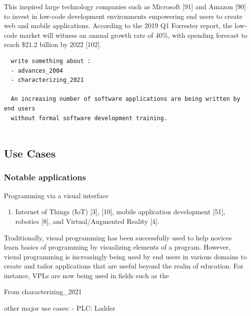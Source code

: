 This inspired large technology companies such as Microsoft [91] and Amazon [90] 
to invest in low-code development environments empowering end users to 
create web and mobile applications. 
According to the 2019 Q1 Forrester report, the low-code market will witness an 
annual growth rate of 40\%, 
with spending forecast to reach \$21.2 billion by 2022 [102]. 

\begin{lstlisting} 
  write something about : 
  - advances_2004
  - characterizing_2021
  
  An increasing number of software applications are being written by end users 
  without formal software development training. 
 
\end{lstlisting}


\subsection{Use Cases}


\subsubsection{Notable applications}

Programming via a visual interface 

\begin{enumerate}
  \item Internet of Things (IoT) [3], [10], mobile 
  application development [51], robotics [8], and Virtual/Augmented Reality [4].
  
\end{enumerate}

\begin{note}
  Traditionally, visual programming has been successfully used to help novices
  learn basics of programming by visualizing elements of a program. 
 However, visual programming is increasingly being used by end 
 users in various domains to create and tailor applications that are useful 
 beyond the realm of education. 
 For instance, VPLs are now being used in fields such as 
 the 
 
 From characterizing_2021
 
 other major use cases: 
 - PLC: Ladder
\end{note}


